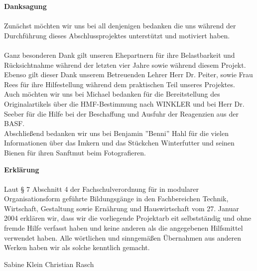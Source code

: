 \documentclass[%
11pt,                               %
liststotoc,                 %
bibtotoc,                       %
]{scrreprt}
\begin{document}







\newpage
\textbf{Danksagung}\\
\\
Zunächst möchten wir uns bei all denjenigen bedanken die uns während der Durchführung dieses Abschlussprojektes unterstützt und motiviert haben. \\
\\
Ganz besonderen Dank gilt unseren Ehepartnern für ihre Belastbarkeit und Rücksichtnahme während der letzten vier Jahre sowie während diesem Projekt.\\
Ebenso gilt dieser Dank unserem Betreuenden Lehrer Herr Dr. Peiter, sowie Frau Rees für ihre Hilfestellung während dem praktischen Teil unseres Projektes.\\
Auch möchten wir uns bei Michael bedanken für die Bereitstellung des Originalartikels über die HMF-Bestimmung nach WINKLER und bei Herr Dr. Seeber für die Hilfe bei der Beschaffung und Ausfuhr der Reagenzien aus der BASF.\\
Abschließend bedanken wir uns bei Benjamin ''Benni'' Hahl für die vielen Informationen über das Imkern und das Stückchen Winterfutter und seinen Bienen für ihren Sanftmut beim Fotografieren.


\listoffigures
\listoftables
\listofdiagrams





\newpage


\vspace*{2cm}
\textbf{Erklärung} \\
\\
Laut §  7  Abschnitt  4  der  Fachschulverordnung für  in  modularer Organisationsform geführte 
Bildungsgänge in den Fachbereichen Technik, Wirtschaft, Gestaltung sowie Ernährung und 
Hauswirtschaft  vom  27.  Januar  2004  erklären  wir,  dass  wir  die  vorliegende  Projektarb
eit 
selbstständig und ohne fremde Hilfe verfasst haben und keine anderen als die angegebenen 
Hilfsmittel  verwendet  haben.  Alle  wörtlichen  und  sinngemäßen  Übernahmen  aus  anderen 
Werken haben wir als solche kenntlich gemacht. 

\vspace*{50pt}Sabine Klein \quad Christian Rasch
\end{document}
